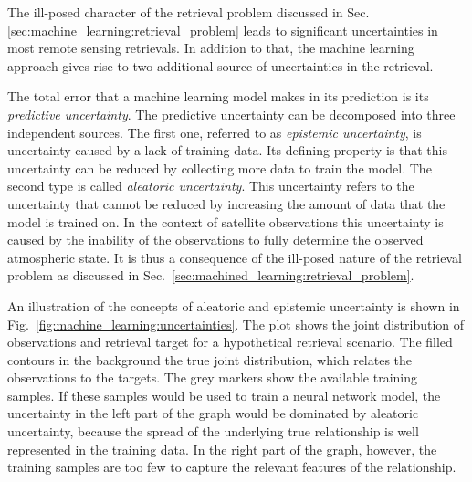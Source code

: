The ill-posed character of the retrieval problem discussed in
Sec. \ref{sec:machine_learning:retrieval_problem} leads to significant
uncertainties in most remote sensing retrievals. In addition to that,
the machine learning approach gives rise to two additional source
of uncertainties in the retrieval.


The total error that a machine learning model makes in its prediction is its
\textit{predictive uncertainty}. The predictive uncertainty can be decomposed
into three independent sources. The first one, referred to as \textit{epistemic
  uncertainty}, is uncertainty caused by a lack of training data. Its defining
property is that this uncertainty can be reduced by collecting more data to
train the model. The second type is called \textit{aleatoric uncertainty}. This
uncertainty refers to the uncertainty that cannot be reduced by increasing the
amount of data that the model is trained on. In the context of satellite
observations this uncertainty is caused by the inability of the observations
to fully determine the observed atmospheric state. It is thus a consequence of
the ill-posed nature of the retrieval problem as discussed in
Sec.~\ref{sec:machined_learning:retrieval_problem}.

An illustration of the concepts of aleatoric and epistemic uncertainty is shown
in Fig.~\ref{fig:machine_learning:uncertainties}. The plot shows the joint
distribution of observations and retrieval target for a hypothetical retrieval
scenario. The filled contours in the background the true joint distribution,
which relates the observations to the targets. The grey markers show the
available training samples. If these samples would be used to train a neural
network model, the uncertainty in the left part of the graph would be dominated
by aleatoric uncertainty, because the spread of the underlying true relationship
is well represented in the training data. In the right part of the graph,
however, the training samples are too few to capture the relevant features of
the relationship.

